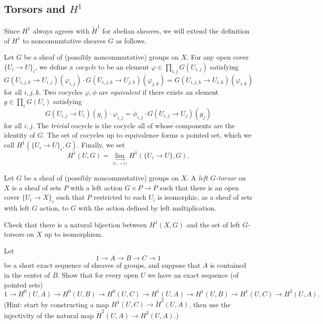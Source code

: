 \subsection{Torsors and $H^1$}

Since $H^1$ always agrees with $\check{H}^1$ for abelian sheaves, we will extend the definition of $H^1$ to noncommutative sheaves $G$ as follows.

\begin{defn} Let $G$ be a sheaf of (possibly noncommutative) groups on $X$. For any open cover $\{U_i\rightarrow U\}_i$, we define a \emph{cocycle} to be an element $\varphi \in \prod_{i,j} G(U_{i,j})$ satisfying
\[
G(U_{i,j,k}\rightarrow U_{i,j})(\varphi_{i,j})\cdot G(U_{i,j,k}\rightarrow U_{j,k})(\varphi_{j,k}) = G(U_{i,j,k}\rightarrow U_{i,k})(\varphi_{i,k})
\]
for all $i,j,k$. Two cocycles $\varphi, \phi$ are \emph{equivalent} if there exists an element $g \in \prod_i G(U_i)$ satisfying
\[
G(U_{i,j}\rightarrow U_i)(g_i)\cdot \varphi_{i,j} = \phi_{i,j}\cdot G(U_{i,j}\rightarrow U_j)(g_j)
\]
for all $i,j$. The \emph{trivial} cocycle is the cocycle all of whose components are the identity of $G$. The set of cocycles up to equivalence forms a pointed set, which we call $H^1(\{U_i\rightarrow U\}_i,G)$. Finally, we set
\[
H^1(U,G) = \underset{\underset{\{U_i\rightarrow U\}}{\longrightarrow}}{\lim} H^1(\{U_i\rightarrow U\}, G).
\]
\end{defn}

\begin{defn} Let $G$ be a sheaf of (possibly noncommutative) groups on $X$. A \emph{left $G$-torsor} on $X$ is a sheaf of sets $P$ with a left action $G\times P\rightarrow P$ such that there is an open cover $\{U_i\rightarrow X\}_i$ such that $P$ restricted to each $U_i$ is isomorphic, as a sheaf of sets with left $G$ action, to $G$ with the action defined by left multiplication.
\end{defn}

\begin{exer} Check that there is a natural bijection between $H^1(X,G)$ and the set of left $G$-torsors on $X$ up to isomorphism.
\end{exer}

\begin{exer} Let
\[
1 \rightarrow A \rightarrow B \rightarrow C \rightarrow 1
\]
be a short exact sequence of sheaves of groups, and suppose that $A$ is contained in the center of $B$. Show that for every open $U$ we have an exact sequence (of pointed sets)
\[
1 \rightarrow H^0(U,A) \rightarrow H^0(U,B) \rightarrow H^0(U,C) \rightarrow H^1(U,A) \rightarrow H^1(U,B) \rightarrow H^1(U,C) \rightarrow H^2(U,A).
\]
(Hint: start by constructing a map $H^1(U,C) \rightarrow \check{H}^2(U,A)$, then use the injectivity of the natural map $\check{H}^2(U,A) \rightarrow H^2(U,A)$.)
\end{exer}

